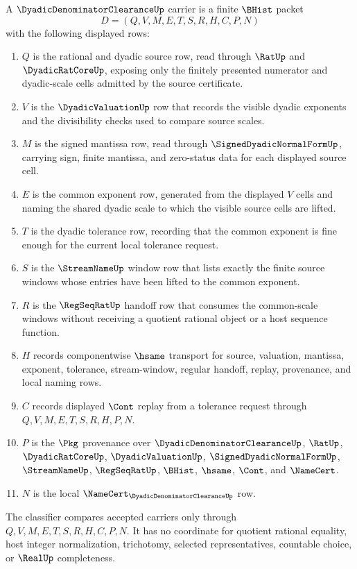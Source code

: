 \begin{definition}
\label{def:dyadic-denominator-clearance-carrier}
A $\DyadicDenominatorClearanceUp$ carrier is a finite $\BHist$ packet
$$
D=(Q,V,M,E,T,S,R,H,C,P,N)
$$
with the following displayed rows:
\begin{enumerate}
\item $Q$ is the rational and dyadic source row, read through $\RatUp$ and $\DyadicRatCoreUp$, exposing only the finitely presented numerator and dyadic-scale cells admitted by the source certificate.
\item $V$ is the $\DyadicValuationUp$ row that records the visible dyadic exponents and the divisibility checks used to compare source scales.
\item $M$ is the signed mantissa row, read through $\SignedDyadicNormalFormUp$, carrying sign, finite mantissa, and zero-status data for each displayed source cell.
\item $E$ is the common exponent row, generated from the displayed $V$ cells and naming the shared dyadic scale to which the visible source cells are lifted.
\item $T$ is the dyadic tolerance row, recording that the common exponent is fine enough for the current local tolerance request.
\item $S$ is the $\StreamNameUp$ window row that lists exactly the finite source windows whose entries have been lifted to the common exponent.
\item $R$ is the $\RegSeqRatUp$ handoff row that consumes the common-scale windows without receiving a quotient rational object or a host sequence function.
\item $H$ records componentwise $\hsame$ transport for source, valuation, mantissa, exponent, tolerance, stream-window, regular handoff, replay, provenance, and local naming rows.
\item $C$ records displayed $\Cont$ replay from a tolerance request through $Q,V,M,E,T,S,R,H,P,N$.
\item $P$ is the $\Pkg$ provenance over $\DyadicDenominatorClearanceUp$, $\RatUp$, $\DyadicRatCoreUp$, $\DyadicValuationUp$, $\SignedDyadicNormalFormUp$, $\StreamNameUp$, $\RegSeqRatUp$, $\BHist$, $\hsame$, $\Cont$, and $\NameCert$.
\item $N$ is the local $\NameCert_{\DyadicDenominatorClearanceUp}$ row.
\end{enumerate}
The classifier compares accepted carriers only through $Q,V,M,E,T,S,R,H,C,P,N$. It has no coordinate for quotient rational equality, host integer normalization, trichotomy, selected representatives, countable choice, or $\RealUp$ completeness.
\end{definition}

